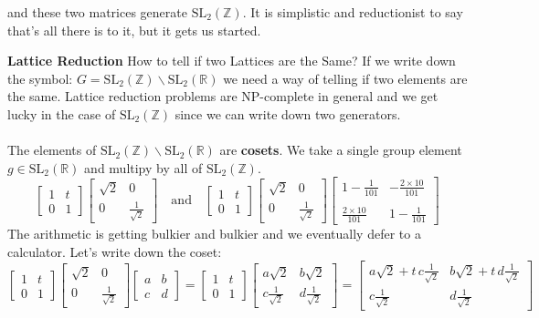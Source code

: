 \documentclass[12pt]{article}
\begin{document}
and these two matrices generate $\text{SL}_2(\mathbb{Z})$.  It is simplistic and reductionist to say that's all there is to it, but it gets us started.
\newpage

\noindent \textbf{Lattice Reduction} How to tell if two Lattices are the Same? If we write down the symbol: $G = \text{SL}_2(\mathbb{Z}) \backslash \text{SL}_2(\mathbb{R})$ we need a way of telling if two elements are the same.  Lattice reduction problems are NP-complete in general and we get lucky in the case of $\text{SL}_2(\mathbb{Z})$ since we can write down two generators.  \\ \\
The elements of $\text{SL}_2(\mathbb{Z}) \backslash \text{SL}_2(\mathbb{R})$ are \textbf{cosets}.  We take a single group element $g \in \text{SL}_2(\mathbb{R})$ and multipy by all of $\text{SL}_2(\mathbb{Z})$. 
$$  \left[ \begin{array}{cc} 1 & t \\ 0 & 1 \end{array} \right]\left[ \begin{array}{cc} \sqrt{2} & 0 \\ 0 & \frac{1}{\sqrt{2}} \end{array} \right]  \quad\text{and}\quad
\left[ \begin{array}{cc} 1 & t \\ 0 & 1 \end{array} \right]\left[ \begin{array}{cc} \sqrt{2} & 0 \\ 0 & \frac{1}{\sqrt{2}} \end{array} \right]
\left[ \begin{array}{rr} 1 - \frac{1}{101} & - \frac{2 \times 10}{101} \\ \\ \frac{2 \times 10}{101} & 1 - \frac{1}{101} \end{array} \right]$$
The arithmetic is getting bulkier and bulkier and we eventually defer to a calculator.  Let's write down the coset:
$$  \left[ \begin{array}{cc} 1 & t \\ 0 & 1 \end{array} \right]\left[ \begin{array}{cc} \sqrt{2} & 0 \\ 0 & \frac{1}{\sqrt{2}} \end{array} \right]
\left[ \begin{array}{cc} a & b \\ c & d \end{array} \right] 
= 
\left[ \begin{array}{cc} 1 & t \\ 0 & 1 \end{array} \right]
\left[ \begin{array}{cc} a \sqrt{2} & b \sqrt{2} \\ c\frac{1}{\sqrt{2}} & d\frac{1}{\sqrt{2}} \end{array} \right] 
= \left[ \begin{array}{rr} 
a \sqrt{2} + t\,c\frac{1}{\sqrt{2}} & b \sqrt{2} + t \, d\frac{1}{\sqrt{2}}  \\ 
c\frac{1}{\sqrt{2}} & d\frac{1}{\sqrt{2}} \end{array} \right]  $$
\end{document}
